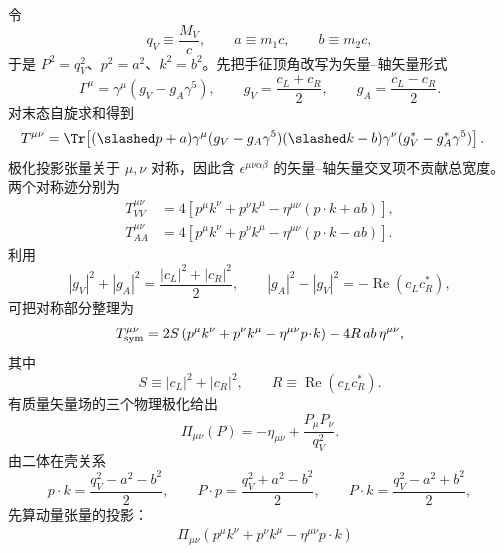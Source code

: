 \begin{derivation}
令
\begin{equation*}
 q_V\equiv\frac{M_V}{c},\qquad a\equiv m_1c,\qquad b\equiv m_2c,
\end{equation*}
于是 $P^2=q_V^2$、$p^2=a^2$、$k^2=b^2$。先把手征顶角改写为矢量--轴矢量形式
\begin{equation*}
 \Gamma^\mu
 =\gamma^\mu(g_V-g_A\gamma^5),\qquad
 g_V=\frac{c_L+c_R}{2},\qquad
 g_A=\frac{c_L-c_R}{2}.
\end{equation*}
对末态自旋求和得到
\begin{align*}
 T^{\mu\nu}
 &=\Tr\!\left[(\slashed p+a)\gamma^\mu(g_V-g_A\gamma^5)
 (\slashed k-b)\gamma^\nu(g_V^*-g_A^*\gamma^5)\right].
\end{align*}
极化投影张量关于 $\mu,\nu$ 对称，因此含 $\epsilon^{\mu\nu\alpha\beta}$ 的矢量--轴矢量交叉项不贡献总宽度。两个对称迹分别为
\begin{align*}
 T_{VV}^{\mu\nu}
 &=4\left[p^\mu k^\nu+p^\nu k^\mu
 -\eta^{\mu\nu}(p\!\cdot\!k+ab)\right],\\
 T_{AA}^{\mu\nu}
 &=4\left[p^\mu k^\nu+p^\nu k^\mu
 -\eta^{\mu\nu}(p\!\cdot\!k-ab)\right].
\end{align*}
利用
\begin{equation*}
 |g_V|^2+|g_A|^2=\frac{|c_L|^2+|c_R|^2}{2},\qquad
 |g_A|^2-|g_V|^2=-\operatorname{Re}(c_Lc_R^*),
\end{equation*}
可把对称部分整理为
\begin{equation*}
 T_{\rm sym}^{\mu\nu}
 =2S\left(p^\mu k^\nu+p^\nu k^\mu-\eta^{\mu\nu}p\!\cdot\!k\right)
 -4R\,ab\,\eta^{\mu\nu},
\end{equation*}
其中
\begin{equation*}
 S\equiv|c_L|^2+|c_R|^2,\qquad
 R\equiv\operatorname{Re}(c_Lc_R^*).
\end{equation*}
有质量矢量场的三个物理极化给出
\begin{equation*}
 \Pi_{\mu\nu}(P)
 =-\eta_{\mu\nu}+\frac{P_\mu P_\nu}{q_V^2}.
\end{equation*}
由二体在壳关系
\begin{equation*}
 p\!\cdot\!k=\frac{q_V^2-a^2-b^2}{2},\qquad
 P\!\cdot\!p=\frac{q_V^2+a^2-b^2}{2},\qquad
 P\!\cdot\!k=\frac{q_V^2-a^2+b^2}{2},
\end{equation*}
先算动量张量的投影：
\begin{align*}
 &\Pi_{\mu\nu}
 \left(p^\mu k^\nu+p^\nu k^\mu-\eta^{\mu\nu}p\!\cdot\!k\right)\\

\end{align*}
\end{derivation}
